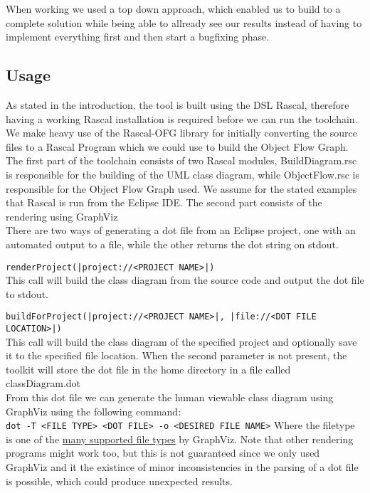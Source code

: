 \documentclass[a4paper,twoside,11pt]{article}
\begin{document}
When working we used a top down approach, which enabled us to build to a complete solution while being able to allready see our results instead of having to implement everything first and then start a bugfixing phase.


\subsection{Usage}
As stated in the introduction, the tool is built using the DSL Rascal, therefore having a working Rascal installation is required before we can run the toolchain. We make heavy use of the Rascal-OFG\cite{url:rascalofg} library for initially converting the source files to a Rascal {\sc Program} which we could use to build the Object Flow Graph. \\

The first part of the toolchain consists of two Rascal modules, {\sc BuildDiagram.rsc} is responsible for the building of the UML class diagram, while {\sc ObjectFlow.rsc} is responsible for the Object Flow Graph used.  We assume for the stated examples that Rascal is run from the Eclipse IDE. The second part consists of the rendering using GraphViz\\

There are two ways of generating a dot file from an Eclipse project, one with an automated output to a file, while the other returns the dot string on stdout. \\

\bigskip

{\tt renderProject(|project://<PROJECT NAME>|)}\\
This call will build the class diagram from the source code and output the dot file to stdout. \\

\bigskip

{\tt buildForProject(|project://<PROJECT NAME>|, |file://<DOT FILE LOCATION>|)} \\
This call will build the class diagram of the specified project and optionally save it to the specified file location. When the second parameter is not present, the toolkit will store the dot file in the home directory in a file called {\sc classDiagram.dot}\\

From this dot file we can generate the human viewable class diagram using GraphViz using the following command: \\
{\tt dot -T <FILE TYPE> <DOT FILE> -o <DESIRED FILE NAME>}
Where the filetype is one of the \href{http://www.graphviz.org/doc/info/output.html}{many supported file types} by GraphViz. Note that other rendering programs might work too, but this is not guaranteed since we only used GraphViz and it the existince of minor inconsistencies in the parsing of a dot file is possible, which could produce unexpected results.
\end{document}
